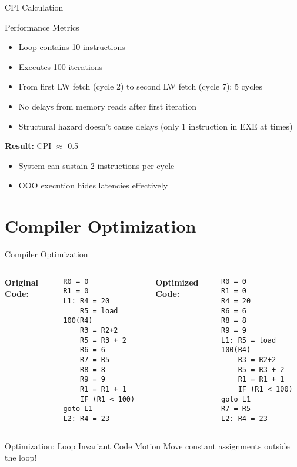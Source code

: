 \documentclass[aspectratio=169,12pt]{beamer}
\begin{document}
\begin{frame}{CPI Calculation}
\begin{block}{Performance Metrics}
\begin{itemize}
    \item Loop contains 10 instructions
    \item Executes 100 iterations
    \item From first LW fetch (cycle 2) to second LW fetch (cycle 7): 5 cycles
    \item No delays from memory reads after first iteration
    \item Structural hazard doesn't cause delays (only 1 instruction in EXE at times)
\end{itemize}
\end{block}

\begin{tcolorbox}[colback=highlightyellow,colframe=darkblue]
\textbf{Result:} CPI $\approx$ 0.5
\begin{itemize}
    \item System can sustain 2 instructions per cycle
    \item OOO execution hides latencies effectively
\end{itemize}
\end{tcolorbox}
\end{frame}

\section{Compiler Optimization}

\begin{frame}[fragile]{Compiler Optimization}
\begin{columns}
\textbf{Original Code:}
\begin{lstlisting}[basicstyle=\ttfamily\tiny]
R0 = 0
R1 = 0
L1: R4 = 20
    R5 = load 100(R4)
    R3 = R2+2
    R5 = R3 + 2
    R6 = 6
    R7 = R5
    R8 = 8
    R9 = 9
    R1 = R1 + 1
    IF (R1 < 100) goto L1
L2: R4 = 23
\end{lstlisting}

\textbf{Optimized Code:}
\begin{lstlisting}[basicstyle=\ttfamily\tiny]
R0 = 0
R1 = 0
R4 = 20
R6 = 6
R8 = 8
R9 = 9
L1: R5 = load 100(R4)
    R3 = R2+2
    R5 = R3 + 2
    R1 = R1 + 1
    IF (R1 < 100) goto L1
R7 = R5
L2: R4 = 23
\end{lstlisting}
\end{columns}

\begin{block}{Optimization: Loop Invariant Code Motion}
Move constant assignments outside the loop!
\end{block}
\end{frame}
\end{document}
